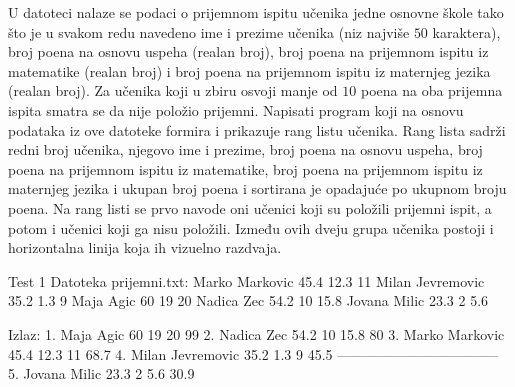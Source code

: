 \begin{Answer}[ref=704]
\end{Answer}


\begin{Exercise}[label=705]
U datoteci  nalaze se podaci o prijemnom ispitu učenika jedne osnovne škole tako što je u svakom redu navedeno ime i prezime učenika (niz najviše $50$ karaktera), broj poena na osnovu uspeha (realan broj), broj poena na prijemnom ispitu iz matematike (realan broj) i broj poena na prijemnom ispitu iz maternjeg jezika (realan broj). Za učenika koji u zbiru osvoji manje od $10$ poena na oba prijemna ispita smatra se da nije položio prijemni. Napisati program koji na osnovu podataka iz ove datoteke formira i prikazuje rang listu učenika. Rang lista sadrži redni broj učenika, njegovo ime i prezime, broj poena na osnovu uspeha, broj poena na prijemnom ispitu iz matematike, broj poena na prijemnom ispitu iz maternjeg jezika i ukupan broj poena i sortirana je opadajuće po ukupnom broju poena. Na rang listi se prvo navode oni učenici koji su položili prijemni ispit, a potom i učenici koji ga nisu položili. Između ovih dveju grupa učenika postoji i horizontalna linija koja ih vizuelno razdvaja. 
\begin{maxitest}
\begin{test}{Test 1}
Datoteka prijemni.txt:
   Marko Markovic 45.4 12.3 11         
   Milan Jevremovic 35.2 1.3 9         
   Maja Agic 60 19 20                  
   Nadica Zec 54.2 10 15.8             
   Jovana Milic 23.3 2 5.6

Izlaz:
1. Maja Agic 60 19 20 99
2. Nadica Zec 54.2 10 15.8 80
3. Marko Markovic 45.4 12.3 11 68.7
4. Milan Jevremovic 35.2 1.3 9 45.5
-----------------------------------
5. Jovana Milic 23.3 2 5.6 30.9
\end{test}
\end{maxitest}
\end{Exercise}
\begin{Answer}[ref=705]
\end{Answer}


